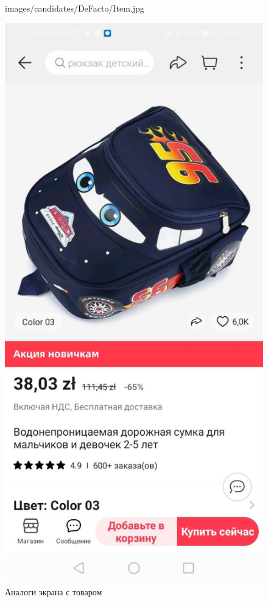 \begin{figure}[!p]
\begin{minipage}{0.16\textwidth}
    {images/candidates/DeFacto/Item.jpg}
  \end{minipage}
  \begin{minipage}{0.16\textwidth}
    \includegraphics[width=.99\linewidth]
    {images/candidates/AliExpress/Item.jpg}
  \end{minipage}

  \caption{Аналоги экрана с товаром}\label{fig:analyzItem}
\end{figure}

